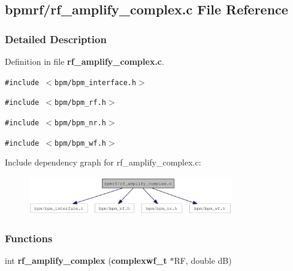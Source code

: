 \subsection{bpmrf/rf\_\-amplify\_\-complex.c File Reference}
\label{rf__amplify__complex_8c}


\subsubsection{Detailed Description}


Definition in file {\bf rf\_\-amplify\_\-complex.c}.

{\tt \#include $<$bpm/bpm\_\-interface.h$>$}\par
{\tt \#include $<$bpm/bpm\_\-rf.h$>$}\par
{\tt \#include $<$bpm/bpm\_\-nr.h$>$}\par
{\tt \#include $<$bpm/bpm\_\-wf.h$>$}\par


Include dependency graph for rf\_\-amplify\_\-complex.c:\nopagebreak
\begin{figure}[H]
\begin{center}
\leavevmode
\includegraphics[width=254pt]{rf__amplify__complex_8c__incl}
\end{center}
\end{figure}
\subsubsection*{Functions}
\begin{CompactItemize}
\item 
int {\bf rf\_\-amplify\_\-complex} ({\bf complexwf\_\-t} $\ast$RF, double dB)
\end{CompactItemize}
